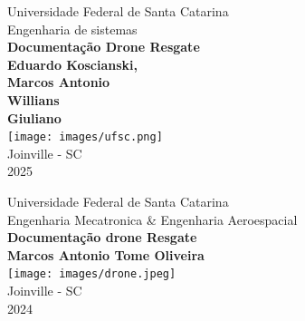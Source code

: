 \documentclass[a4paper,12pt]{report}
\begin{document}
\begin{titlepage}
    \begin{center}
       
        {\Large Universidade Federal de Santa Catarina}\\[1.5cm]
        {\Large Engenharia de sistemas}\\[3cm]
        
        {\LARGE\textbf{Documentação Drone Resgate}}\\[2cm]
        
        \textbf{Eduardo Koscianski,\\
        Marcos Antonio\\
        Willians\\
        Giuliano}\\[4cm]
        \texttt{[image: images/ufsc.png]}\\     
        \vfill
        Joinville - SC\\
        2025
    \end{center}
\end{titlepage}

\begin{titlepage}
    \begin{center}
      {\Large Universidade Federal de Santa Catarina}\\[1.5cm]
        {\Large Engenharia Mecatronica \&  Engenharia Aeroespacial}\\[3cm]
        
        {\LARGE\textbf{Documentação drone Resgate}}\\[2cm]
        
        \textbf{Marcos Antonio Tome Oliveira}\\[4cm]
      \texttt{[image: images/drone.jpeg]}\\ 
      
        
        \vfill
        Joinville - SC\\
        2024
    \end{center}
\end{titlepage}

\tableofcontents
\listoffigures
\newpage
\end{document}
